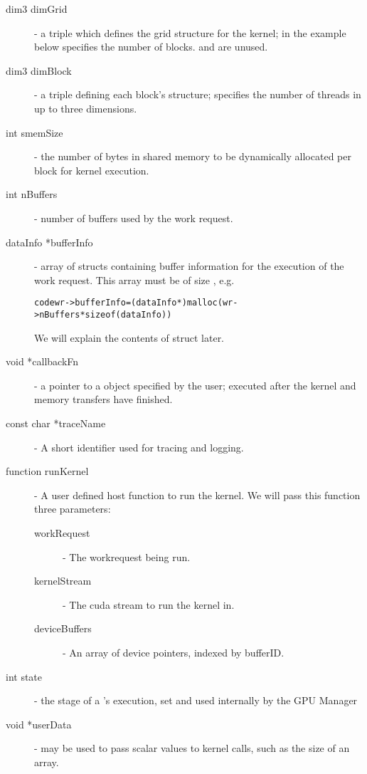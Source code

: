 \documentclass[10pt]{report}
\begin{document}
\begin{description}
\item[dim3 dimGrid]- a triple which defines the grid structure for the kernel;
in the example below  specifies the number of blocks.
 and  are unused.

\item[dim3 dimBlock]- a triple defining each block's structure;
specifies the number of threads in up to three dimensions.

\item[int smemSize]- the number of bytes in shared memory to be dynamically
allocated per block for kernel execution.

\item[int nBuffers]- number of buffers used by the work request.

\item[dataInfo *bufferInfo]- array of  structs containing buffer
information for the execution of the work request. This array must be of size , e.g.
\begin{alltt}
code{wr->bufferInfo = (dataInfo *) malloc(wr->nBuffers * sizeof(dataInfo))}
\end{alltt}
We will explain the contents of  struct later.

\item[void *callbackFn]- a pointer to a  object specified by the user;
executed after the kernel and memory transfers have finished.

\item[const char *traceName]- A short identifier used for tracing and logging.

\item[function runKernel]- A user defined host function to run the kernel.
   We will pass this function three parameters:
   \begin{description}
   \item[workRequest]- The workrequest being run.
   \item[kernelStream]- The cuda stream to run the kernel in.
   \item[deviceBuffers]- An array of device pointers, indexed by bufferID.
   \end{description}

\item[int state]- the stage of a 's execution, set and used internally by the GPU Manager

\item[void *userData]-  may be used to pass scalar values to kernel
calls, such as the size of an array.

\end{description}
\end{document}
